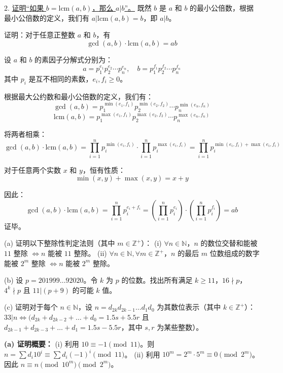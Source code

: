 \begin{questions}
\begin{solution}
2. \underline{证明“如果 $b = \text{lcm}(a, b)$，那么 $a|b$”。}
既然 $b$ 是 $a$ 和 $b$ 的最小公倍数，根据最小公倍数的定义，我们有 $a|\text{lcm}(a, b) = b$，即 $a|b$。
\end{solution}

\question
证明：对于任意正整数 $a$ 和 $b$，有
\[
\gcd(a, b) \cdot \text{lcm}(a, b) = ab
\]

\begin{solution}
设 $a$ 和 $b$ 的素因子分解式分别为：
\[
a = p_1^{e_1} p_2^{e_2} \cdots p_n^{e_n}, \quad b = p_1^{f_1} p_2^{f_2} \cdots p_n^{f_n}
\]
其中 $p_i$ 是互不相同的素数，$e_i, f_i \ge 0$。

根据最大公约数和最小公倍数的定义，我们有：
\[
\gcd(a, b) = p_1^{\min(e_1, f_1)} p_2^{\min(e_2, f_2)} \cdots p_n^{\min(e_n, f_n)}
\]
\[
\text{lcm}(a, b) = p_1^{\max(e_1, f_1)} p_2^{\max(e_2, f_2)} \cdots p_n^{\max(e_n, f_n)}
\]

将两者相乘：
\[
\gcd(a, b) \cdot \text{lcm}(a, b) = \prod_{i=1}^{n} p_i^{\min(e_i, f_i)} \cdot \prod_{i=1}^{n} p_i^{\max(e_i, f_i)} = \prod_{i=1}^{n} p_i^{\min(e_i, f_i) + \max(e_i, f_i)}
\]

对于任意两个实数 $x$ 和 $y$，恒有性质：
\[
\min(x, y) + \max(x, y) = x + y
\]

因此：
\[
\gcd(a, b) \cdot \text{lcm}(a, b) = \prod_{i=1}^{n} p_i^{e_i + f_i} = \left( \prod_{i=1}^{n} p_i^{e_i} \right) \cdot \left( \prod_{i=1}^{n} p_i^{f_i} \right) = ab
\]
证毕。
\end{solution}

\question
(a) 证明以下整除性判定法则（其中 $m \in \mathbb{Z}^+$）：
(i) $\forall n \in \mathbb{N}$，$n$ 的数位交替和能被 $11$ 整除 $\iff n$ 能被 $11$ 整除。
(ii) $\forall n \in \mathbb{N}, \forall m \in \mathbb{Z}^+$，$n$ 的最后 $m$ 位数组成的数字能被 $2^m$ 整除 $\iff n$ 能被 $2^m$ 整除。

(b) 设 $p = 201999 \dots 92020$。令 $k$ 为 $p$ 的位数。找出所有满足 $k \ge 11$，$16 \nmid p$，$4^k \nmid p$ 且 $11 | (p + 9)$ 的可能 $k$ 值。

(c) 证明对于每个 $n \in \mathbb{N}$，设 $n = d_{2k}d_{2k-1} \dots d_1d_0$ 为其数位表示（其中 $k \in \mathbb{Z}^+$）：
$33 | n \iff (d_{2k} + d_{2k-2} + \dots + d_0 = 1.5s + 5.5r$ 且 $d_{2k-1} + d_{2k-3} + \dots + d_1 = 1.5s - 5.5r$，其中 $s, r$ 为某些整数）。

\begin{solution}
\textbf{(a) 证明概要：}
(i) 利用 $10 \equiv -1 \pmod{11}$。则 $n = \sum d_i 10^i \equiv \sum d_i (-1)^i \pmod{11}$。
(ii) 利用 $10^m = 2^m \cdot 5^m \equiv 0 \pmod{2^m}$。因此 $n \equiv n \pmod{10^m} \pmod{2^m}$。


\end{solution}
\end{questions}
